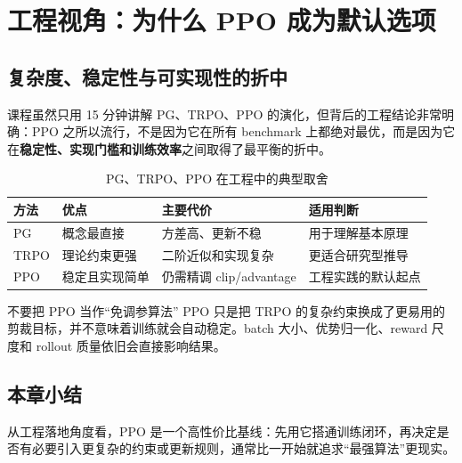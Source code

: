 \section{工程视角：为什么 PPO 成为默认选项}
\subsection{复杂度、稳定性与可实现性的折中}
课程虽然只用 15 分钟讲解 PG、TRPO、PPO 的演化，但背后的工程结论非常明确：PPO 之所以流行，不是因为它在所有 benchmark 上都绝对最优，而是因为它在\textbf{稳定性、实现门槛和训练效率}之间取得了最平衡的折中。

\begin{table}[H]
\centering
\begin{tabular}{p{2.6cm}p{3.5cm}p{3.7cm}p{3.2cm}}
\toprule
方法 & 优点 & 主要代价 & 适用判断 \\
\midrule
PG & 概念最直接 & 方差高、更新不稳 & 用于理解基本原理 \\
TRPO & 理论约束更强 & 二阶近似和实现复杂 & 更适合研究型推导 \\
PPO & 稳定且实现简单 & 仍需精调 clip/advantage & 工程实践的默认起点 \\
\bottomrule
\end{tabular}
\caption{PG、TRPO、PPO 在工程中的典型取舍}
\end{table}

\begin{warningbox}{不要把 PPO 当作“免调参算法”}
PPO 只是把 TRPO 的复杂约束换成了更易用的剪裁目标，并不意味着训练就会自动稳定。batch 大小、优势归一化、reward 尺度和 rollout 质量依旧会直接影响结果。
\end{warningbox}

\subsection{本章小结}
从工程落地角度看，PPO 是一个高性价比基线：先用它搭通训练闭环，再决定是否有必要引入更复杂的约束或更新规则，通常比一开始就追求“最强算法”更现实。

\newpage
